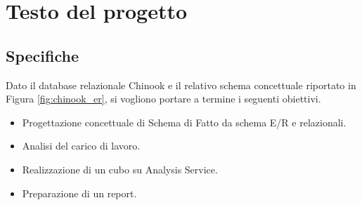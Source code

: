 \documentclass[12pt,a4paper,openright,oneside]{report}
\begin{document}
	\begin{titlepage}                       %
		\newpage                                %
		\clearpage{\pagestyle{empty}\cleardoublepage}%
	\end{titlepage}
	\tableofcontents                        %
	\clearpage{\pagestyle{empty}\cleardoublepage}
	\listoffigures                          %
	\clearpage{\pagestyle{empty}\cleardoublepage}
	\listoftables                           %
	\clearpage{\pagestyle{empty}\cleardoublepage}
	\lstlistoflistings						%
	\clearpage{\pagestyle{empty}\cleardoublepage}
	\chapter{Testo del progetto}           %
	\lhead[\fancyplain{}{\bfseries\thepage}]{\fancyplain{}{\bfseries\rightmark}}
	\section{Specifiche}
	Dato il database relazionale Chinook e il relativo schema concettuale riportato
	in Figura \ref{fig:chinook_er}, si vogliono portare a termine i seguenti obiettivi.
	\begin{itemize}
		\item Progettazione concettuale di Schema di Fatto da schema E/R e relazionali.
		\item Analisi del carico di lavoro.
		\item Realizzazione di un cubo su Analysis Service.
		\item Preparazione di un report.
	\end{itemize}
\end{document}
